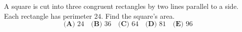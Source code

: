 A square is cut into three congruent rectangles by two lines parallel to a side. Each rectangle has perimeter $24$. Find the square's area.
\[\textbf{(A) }24\quad\textbf{(B) }36\quad\textbf{(C) }64\quad\textbf{(D) }81\quad\textbf{(E) }96\]
